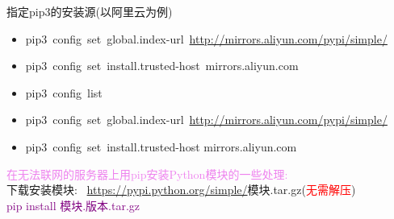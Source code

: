 \documentclass[10pt,a4paper]{article}
\begin{document}
指定\textrm{pip3}的安装源(以阿里云为例)
\begin{itemize}
	\item \textrm{pip3~config~set~global.index-url~\url{http://mirrors.aliyun.com/pypi/simple/}}
	\item \textrm{pip3~config~set~install.trusted-host~mirrors.aliyun.com}
	\item \textrm{pip3~config~list}
	\item \textrm{pip3~config~set~global.index-url~\url{http://mirrors.aliyun.com/pypi/simple/}}
	\item \textrm{pip3~config~set~install.trusted-host mirrors.aliyun.com}
\end{itemize}

\textcolor{violet}{在无法联网的服务器上用\textrm{pip}安装\textrm{Python}模块的一些处理:}\\
下载安装模块:~ \textrm{\url{https://pypi.python.org/simple/}}模块.tar.gz\:\:\:(\textcolor{red}{无需解压})\\
\textcolor{purple}{pip install 模块.版本.tar.gz}\\
\end{document}

